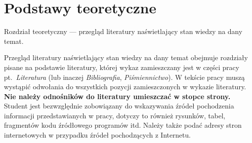 \chapter{Podstawy teoretyczne}

Rozdział teoretyczny --- przegląd literatury naświetlający stan wiedzy na dany temat. 

Przegląd literatury naświetlający stan wiedzy na dany temat obejmuje rozdziały pisane na podstawie
literatury, której wykaz zamieszczany jest w części pracy pt.~\emph{Literatura} (lub inaczej \emph{Bibliografia},
\emph{Piśmiennictwo}). W tekście pracy muszą wystąpić odwołania do wszystkich pozycji zamieszczonych w
wykazie literatury. \textbf{Nie należy odnośników do literatury umieszczać w stopce strony.} Student jest
bezwzględnie zobowiązany do wskazywania źródeł pochodzenia informacji przedstawianych w pracy,
dotyczy to również rysunków, tabel, fragmentów kodu źródłowego programów itd. Należy także podać
adresy stron internetowych w przypadku źródeł pochodzących z Internetu.